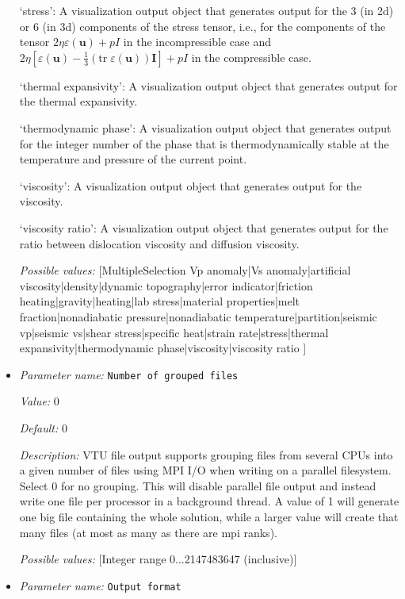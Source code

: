 \begin{itemize}
`stress': A visualization output object that generates output for the 3 (in 2d) or 6 (in 3d) components of the stress tensor, i.e., for the components of the tensor $2\eta\varepsilon(\mathbf u)+pI$ in the incompressible case and $2\eta\left[\varepsilon(\mathbf u)-\tfrac 13(\textrm{tr}\;\varepsilon(\mathbf u))\mathbf I\right]+pI$ in the compressible case.

`thermal expansivity': A visualization output object that generates output for the thermal expansivity.

`thermodynamic phase': A visualization output object that generates output for the integer number of the phase that is thermodynamically stable at the temperature and pressure of the current point.

`viscosity': A visualization output object that generates output for the viscosity.

`viscosity ratio': A visualization output object that generates output for the ratio between dislocation viscosity and diffusion viscosity.


{\it Possible values:} [MultipleSelection Vp anomaly|Vs anomaly|artificial viscosity|density|dynamic topography|error indicator|friction heating|gravity|heating|lab stress|material properties|melt fraction|nonadiabatic pressure|nonadiabatic temperature|partition|seismic vp|seismic vs|shear stress|specific heat|strain rate|stress|thermal expansivity|thermodynamic phase|viscosity|viscosity ratio ]
\item {\it Parameter name:} {\tt Number of grouped files}
\label{parameters:Postprocess/Visualization/Number of grouped files}


{\it Value:} 0


{\it Default:} 0


{\it Description:} VTU file output supports grouping files from several CPUs into a given number of files using MPI I/O when writing on a parallel filesystem. Select 0 for no grouping. This will disable parallel file output and instead write one file per processor in a background thread. A value of 1 will generate one big file containing the whole solution, while a larger value will create that many files (at most as many as there are mpi ranks).


{\it Possible values:} [Integer range 0...2147483647 (inclusive)]
\item {\it Parameter name:} {\tt Output format}
\label{parameters:Postprocess/Visualization/Output format}



\end{itemize}
